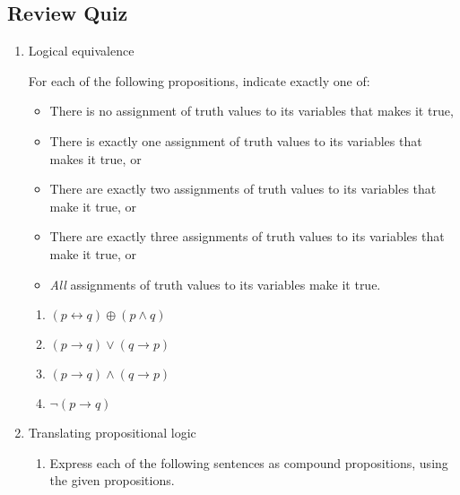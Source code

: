 \documentclass[12pt, oneside]{article}
\begin{document}
\subsection*{Review Quiz}
\begin{enumerate}
\item Logical equivalence
 

For each of the following propositions, indicate exactly one of:

\begin{itemize}
    \item There is no assignment of truth values to its variables that makes it true,
    \item There is exactly one assignment of truth values to its variables that makes it true, or
    \item There are exactly two assignments of truth values to its variables that make it true, or
    \item There are exactly three assignments of truth values to its variables that make it true, or
    \item \emph{All} assignments of truth values to its variables make it true.
\end{itemize}

\begin{enumerate}
    \item $(p \leftrightarrow q) \oplus (p \land q)$
    \item $(p \to q) \vee (q \to p)$
    \item $(p \to q) \land (q \to p)$
    \item $\lnot (p \to q) $
\end{enumerate} \item Translating propositional logic
    \begin{enumerate}
    \item 

Express each of the following sentences as compound propositions, using
the given propositions.


\end{enumerate}
\end{enumerate}
\end{document}
